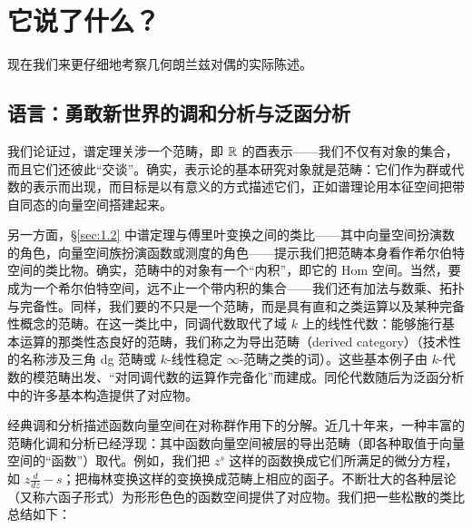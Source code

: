 \section{它说了什么？}\label{sec:2}

现在我们来更仔细地考察几何朗兰兹对偶的实际陈述。

\subsection{语言：勇敢新世界的调和分析与泛函分析}\label{sec:2.1}

我们论证过，谱定理关涉一个范畴，即 $\mathbb{R}$ 的酉表示——我们不仅有对象的集合，而且它们还彼此“交谈”。确实，表示论的基本研究对象就是范畴：它们作为群或代数的表示而出现，而目标是以有意义的方式描述它们，正如谱理论用本征空间把带自同态的向量空间搭建起来。

另一方面，\S\ref{sec:1.2} 中谱定理与傅里叶变换之间的类比——其中向量空间扮演数的角色，向量空间族扮演函数或测度的角色——提示我们把范畴本身看作希尔伯特空间的类比物。确实，范畴中的对象有一个“内积”，即它的 Hom 空间。当然，要成为一个希尔伯特空间，远不止一个带内积的集合——我们还有加法与数乘、拓扑与完备性。同样，我们要的不只是一个范畴，而是具有直和之类运算以及某种完备性概念的范畴。在这一类比中，同调代数取代了域 $k$ 上的线性代数：能够施行基本运算的那类性态良好的范畴，我们称之为导出范畴（derived category）（技术性的名称涉及三角 dg 范畴或 $k$-线性稳定 $\infty$-范畴之类的词）。这些基本例子由 $k$-代数的模范畴出发、“对同调代数的运算作完备化”而建成。同伦代数随后为泛函分析中的许多基本构造提供了对应物。

经典调和分析描述函数向量空间在对称群作用下的分解。近几十年来，一种丰富的范畴化调和分析已经浮现：其中函数向量空间被层的导出范畴（即各种取值于向量空间的“函数”）取代。例如，我们把 $z^{s}$ 这样的函数换成它们所满足的微分方程，如 $z\frac{d}{dz}-s$；把梅林变换这样的变换换成范畴上相应的函子。不断壮大的各种层论（又称六函子形式）为形形色色的函数空间提供了对应物。我们把一些松散的类比总结如下：

